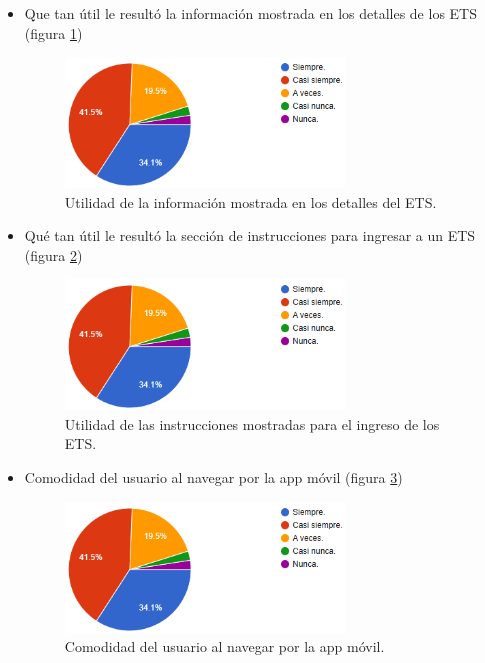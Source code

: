 \begin{itemize}
	\item Que tan útil le resultó la información mostrada en los detalles de los ETS (figura \ref{fig:IIETS})
	\begin{figure}[H]
		\centering
		\includegraphics[width=0.7\textwidth]{images/FRF.png}
		\caption{Utilidad de la información mostrada en los detalles del ETS.}
		\label{fig:IIETS}
	\end{figure}
	\newpage
	
	\item Qué tan útil le resultó la sección de instrucciones para ingresar a un ETS (figura \ref{fig:USIETS})
	\begin{figure}[H]
		\centering
		\includegraphics[width=0.7\textwidth]{images/FRF.png}
		\caption{Utilidad de las instrucciones mostradas para el ingreso de los ETS.}
		\label{fig:USIETS}
	\end{figure}
	
	\item Comodidad del usuario al navegar por la app móvil (figura \ref{fig:CNU})
	\begin{figure}[H]
		\centering
		\includegraphics[width=0.7\textwidth]{images/FRF.png}
		\caption{Comodidad del usuario al navegar por la app móvil.}
		\label{fig:CNU}
	\end{figure}
	\newpage
	

\end{itemize}
